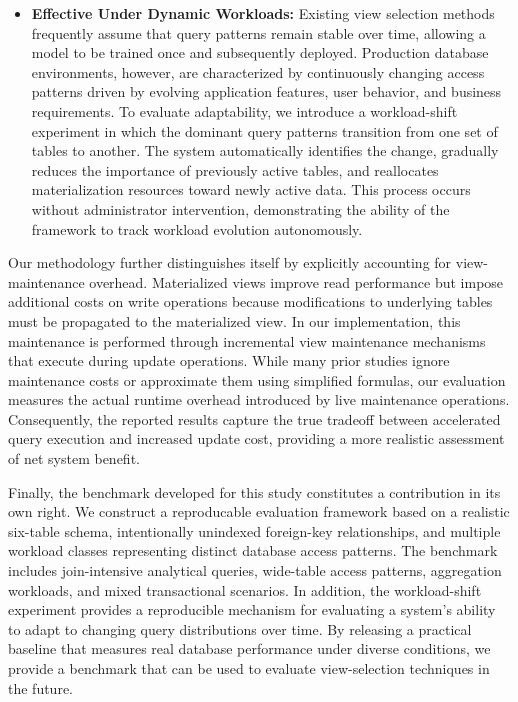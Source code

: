 \begin{itemize}
\item \textbf{Effective Under Dynamic Workloads:} Existing view selection methods frequently assume that query patterns remain stable over time, allowing a model to be trained once and subsequently deployed. Production database environments, however, are characterized by continuously changing access patterns driven by evolving application features, user behavior, and business requirements. To evaluate adaptability, we introduce a workload-shift experiment in which the dominant query patterns transition from one set of tables to another. The system automatically identifies the change, gradually reduces the importance of previously active tables, and reallocates materialization resources toward newly active data. This process occurs without administrator intervention, demonstrating the ability of the framework to track workload evolution autonomously.

\end{itemize}

Our methodology further distinguishes itself by explicitly accounting for view-maintenance overhead. Materialized views improve read performance but impose additional costs on write operations because modifications to underlying tables must be propagated to the materialized view. In our implementation, this maintenance is performed through incremental view maintenance mechanisms that execute during update operations. While many prior studies ignore maintenance costs or approximate them using simplified formulas, our evaluation measures the actual runtime overhead introduced by live maintenance operations. Consequently, the reported results capture the true tradeoff between accelerated query execution and increased update cost, providing a more realistic assessment of net system benefit.

Finally, the benchmark developed for this study constitutes a contribution in its own right. We construct a reproducable evaluation framework based on a realistic six-table schema, intentionally unindexed foreign-key relationships, and multiple workload classes representing distinct database access patterns. The benchmark includes join-intensive analytical queries, wide-table access patterns, aggregation workloads, and mixed transactional scenarios. In addition, the workload-shift experiment provides a reproducible mechanism for evaluating a system's ability to adapt to changing query distributions over time. By releasing a practical baseline that measures real database performance under diverse conditions, we provide a benchmark that can be used to evaluate view-selection techniques in the future.